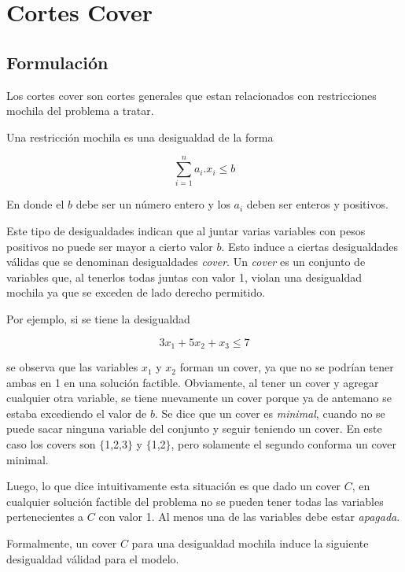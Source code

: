 \section{Cortes Cover}


\subsection{Formulaci\'on}

Los cortes cover son cortes generales que estan relacionados con restricciones mochila del problema a tratar.

Una restricci\'on mochila es una desigualdad de la forma

\begin{equation}
\sum\limits_{i=1}^n a_i . x_i \leq b
\end{equation}

En donde el $b$ debe ser un n\'umero entero y los $a_i$ deben ser enteros y positivos.


Este tipo de desigualdades indican que al juntar varias variables con pesos positivos no puede ser mayor a cierto valor $b$. Esto induce a ciertas desigualdades v\'alidas que se denominan desigualdades \emph{cover}. Un \emph{cover} es un conjunto de variables que, al tenerlos todas juntas con valor 1, violan una desigualdad mochila ya que se exceden de lado derecho permitido.

Por ejemplo, si se tiene la desigualdad

\begin{equation}
3 x_1 + 5 x_2 + x_3 \leq 7
\end{equation}

se observa que las variables $x_1$ y $x_2$ forman un cover, ya que no se podr\'ian tener ambas en 1 en una soluci\'on factible. Obviamente, al tener un cover y agregar cualquier otra variable, se tiene nuevamente un cover porque ya de antemano se estaba excediendo el valor de $b$. Se dice que un cover es \emph{minimal}, cuando no se puede sacar ninguna variable del conjunto y seguir teniendo un cover. En este caso los covers son $\{$1,2,3$\}$ y $\{$1,2$\}$, pero solamente el segundo conforma un cover minimal.



Luego, lo que dice intuitivamente esta situaci\'on es que dado un cover $C$, en cualquier soluci\'on factible del problema no se pueden tener todas las variables pertenecientes a $C$ con valor 1. Al menos una de las variables debe estar \emph{apagada}.

Formalmente, un cover $C$ para una desigualdad mochila induce la siguiente desigualdad v\'alidad para el modelo.

